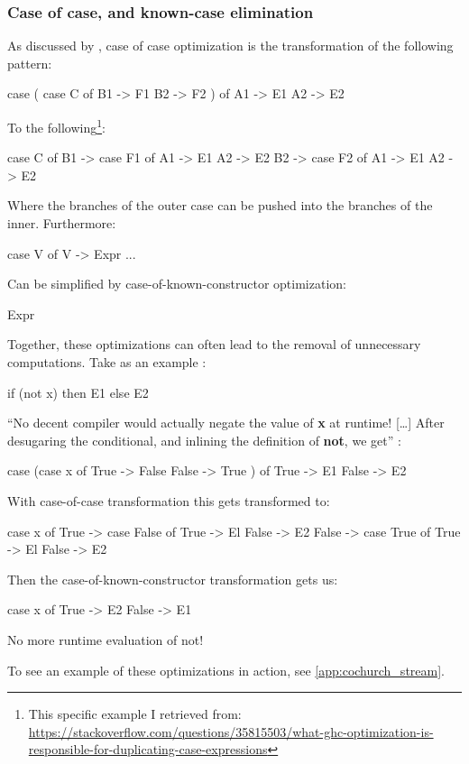 \subsubsection{Case of case, and known-case elimination}
As discussed by \cite{Jones1996}, case of case optimization is the transformation of the following pattern:
\begin{spec}
case ( 
  case C of 
    B1 -> F1
    B2 -> F2
  ) of
    A1 -> E1
    A2 -> E2
\end{spec}
To the following\footnote{This specific example I retrieved from: \url{https://stackoverflow.com/questions/35815503/what-ghc-optimization-is-responsible-for-duplicating-case-expressions}}:
\begin{spec}
case C of    
  B1 -> case F1 of
    A1 -> E1
    A2 -> E2
  B2 -> case F2 of
    A1 -> E1
    A2 -> E2
\end{spec}
Where the branches of the outer case can be pushed into the branches of the inner.
Furthermore:
\begin{spec}
case V of
  V -> Expr
  ...
\end{spec}
Can be simplified by case-of-known-constructor optimization:
\begin{spec}
Expr
\end{spec}
Together, these optimizations can often lead to the removal of unnecessary computations. Take as an example \citep{Jones1996}:
\begin{spec}
if (not x) then E1 else E2
\end{spec}
``No decent compiler would actually negate the value of \textbf{x} at runtime! [\ldots] After desugaring the conditional, and inlining the definition of \textbf{not}, we get'' \citep{Jones1996}:
\begin{spec}
case (case x of
  True -> False
  False -> True
) of 
  True -> E1 
  False -> E2
\end{spec}
With case-of-case transformation this gets transformed to:
\begin{spec}
case x of 
  True -> case False of
    True -> El
    False -> E2
  False -> case True of
    True -> El
    False -> E2
\end{spec}
Then the case-of-known-constructor transformation gets us:
\begin{spec}
case x of
  True -> E2
  False -> E1
\end{spec}
No more runtime evaluation of not!

To see an example of these optimizations in action, see \autoref{app:cochurch_stream}.


